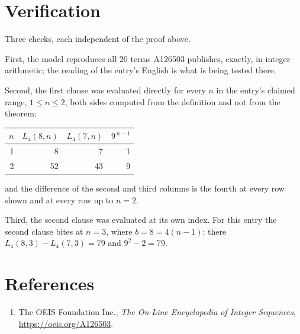 \documentclass[11pt,a4paper]{article}
\theoremstyle{plain}
\theoremstyle{definition}
\begin{document}
\section{Verification}

Three checks, each independent of the proof above.

First, the model reproduces all $20$ terms A126503 publishes, exactly, in integer
arithmetic; the reading of the entry's English is what is being tested there.

Second, the first clause was evaluated directly for every $n$ in the entry's claimed range,
$1\le n\le2$, both sides computed from the definition and not from the theorem:

\begin{center}
\begin{tabular}{rrrr}
$n$ & $L_{4}(8,n)$ & $L_{4}(7,n)$ & $9^{\,n-1}$ \\ \hline
1 & 8 & 7 & 1 \\
2 & 52 & 43 & 9 \\
\end{tabular}
\end{center}

\noindent and the difference of the second and third columns is the fourth at every row shown
and at every row up to $n=2$.

Third, the second clause was evaluated at its own index. For this entry the second clause bites at $n=3$, where $b=8=4(n-1)$: there $L_{4}(8,3)-L_{4}(7,3)=79$ and $9^{2}-2=79$.

\section*{References}
\begin{enumerate}
\item The OEIS Foundation Inc., \emph{The On-Line Encyclopedia of Integer Sequences},
\url{https://oeis.org/A126503}.
\end{enumerate}
\end{document}
